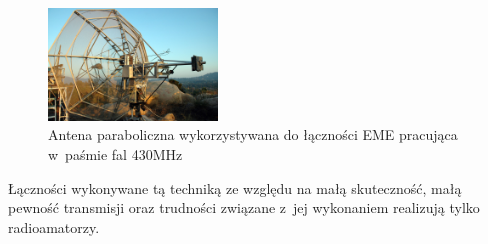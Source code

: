 \documentclass[]{mgr}
\begin{document}
                        \begin{figure}
                            \vspace{-20pt}
                            \begin{center}
                                \includegraphics[width=0.4\textwidth]{eme_antenna}
                            \end{center}
                            \vspace{-20pt}
                            \caption{Antena paraboliczna wykorzystywana do łączności EME pracująca w~paśmie fal 430MHz}
                            \vspace{-20pt}
                            \label{fig:eme_antenna}
                        \end{figure}

                    Łączności wykonywane tą techniką ze względu na małą skuteczność, małą pewność transmisji oraz trudności związane z~jej wykonaniem realizują tylko radioamatorzy.
\end{document}
